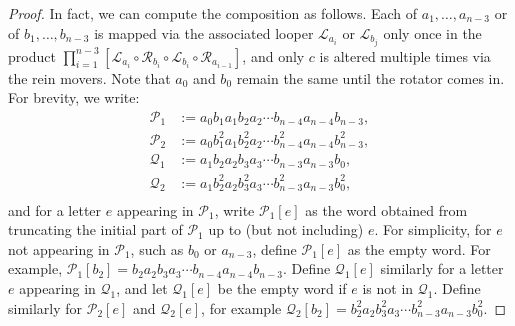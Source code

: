 \documentclass[11pt, letterpaper]{amsart}
\theoremstyle{plain}
\theoremstyle{definition}
\newcommand{\cL}{\mathcal{L}}
\newcommand{\cR}{\mathcal{R}}
\newcommand{\cP}{\mathcal{P}}
\newcommand{\cQ}{\mathcal{Q}}
\begin{document}
\begin{proof}
In fact, we can compute the composition as follows. Each of $a_1,
\ldots, a_{n-3}$ or of $b_1, \ldots, b_{n-3}$ is mapped via the associated looper
$\cL_{a_i}$ or $\cL_{b_j}$ only once in the product  $\prod_{i=1}^{n-3}[\cL_{a_{i}} \circ \cR_{b_i} \circ \cL_{b_i} \circ \cR_{a_{i-1}}]$, and only $c$ is altered multiple times via the rein movers. Note that $a_0$ and $b_0$ remain the same until the rotator comes in. For brevity, we write:
\begin{align*}
  \cP_1&:= a_0b_1a_1b_2a_2\cdots b_{n-4}a_{n-4}b_{n-3},\\
  \cP_2&:= a_0b_1^2a_1b_2^2a_2\cdots b_{n-4}^2a_{n-4}b_{n-3}^2,\\
  \cQ_1&:= a_1b_2a_2b_3a_3\cdots b_{n-3}a_{n-3}b_0, \\
  \cQ_2&:= a_1b_2^2a_2b_3^2a_3\cdots b_{n-3}^2a_{n-3}b_0^2, \\
\end{align*}
and for a letter $e$ appearing in $\cP_1$, write $\cP_1[e]$ as the word obtained
from truncating the initial part of $\cP_1$ up to (but not including) $e$. For simplicity,
for $e$ not appearing in $\cP_1$, such as $b_0$ or $a_{n-3}$, define $\cP_1[e]$ as
the empty word. For example, $\cP_1[b_2] = b_2a_2b_3a_3\cdots
b_{n-4}a_{n-4}b_{n-3}$. Define $\cQ_1[e]$ similarly for a letter $e$ appearing in
$\cQ_1$, and let $\cQ_1[e]$ be the empty word if $e$ is not in $\cQ_1$. Define
similarly for $\cP_2[e]$ and $\cQ_2[e]$, for example
$\cQ_2[b_2]=b_2^2a_2b_3^2a_3\cdots b_{n-3}^2a_{n-3}b_0^2$.


\end{proof}
\end{document}
